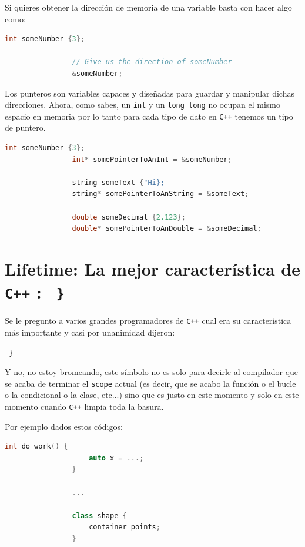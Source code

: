 \documentclass[12pt, fleqn]{report}                             %
\theoremstyle{break}                                            %
\newcommand{\textCode}[1]  { \texttt{#1} }                      %
\newcommand \Cpp  {\textCode{C++} }                               %
\begin{document}
            Si quieres obtener la dirección de memoria de una variable basta con hacer algo como:
            \begin{lstlisting}[language=C++, gobble=16]
                int someNumber {3};

                // Give us the direction of someNumber
                &someNumber;
            \end{lstlisting}

            Los punteros son variables capaces y diseñadas para guardar y manipular dichas direcciones.
            Ahora, como sabes, un \textCode{int} y un \textCode{long long} no ocupan el 
            mismo espacio en memoria por lo tanto para cada tipo de dato en \Cpp tenemos un tipo de puntero.
            \begin{lstlisting}[language=C++, gobble=16]
                int someNumber {3};
                int* somePointerToAnInt = &someNumber;

                string someText {"Hi};
                string* somePointerToAnString = &someText;

                double someDecimal {2.123};
                double* somePointerToAnDouble = &someDecimal;
            \end{lstlisting}


        \clearpage
        \section{Lifetime: La mejor característica de \Cpp: \textCode{ \} } }     
        
            Se le pregunto a varios grandes programadores de \Cpp cual era su
            característica más importante y casi por unanimidad dijeron:

            \textCode{ \} }

            Y no, no estoy bromeando, este símbolo no es solo para decirle al compilador
            que se acaba de terminar el \textCode{scope} actual (es decir, que se acabo 
            la función o el bucle o la condicional o la clase, etc...) sino que es justo
            en este momento y solo en este momento cuando \Cpp limpia toda la basura.

            Por ejemplo dados estos códigos:
            \begin{lstlisting}[language=C++, gobble=16]
                int do_work() {
                    auto x = ...;
                }

                ...

                class shape {
                    container points;
                }
            \end{lstlisting}
\end{document}
